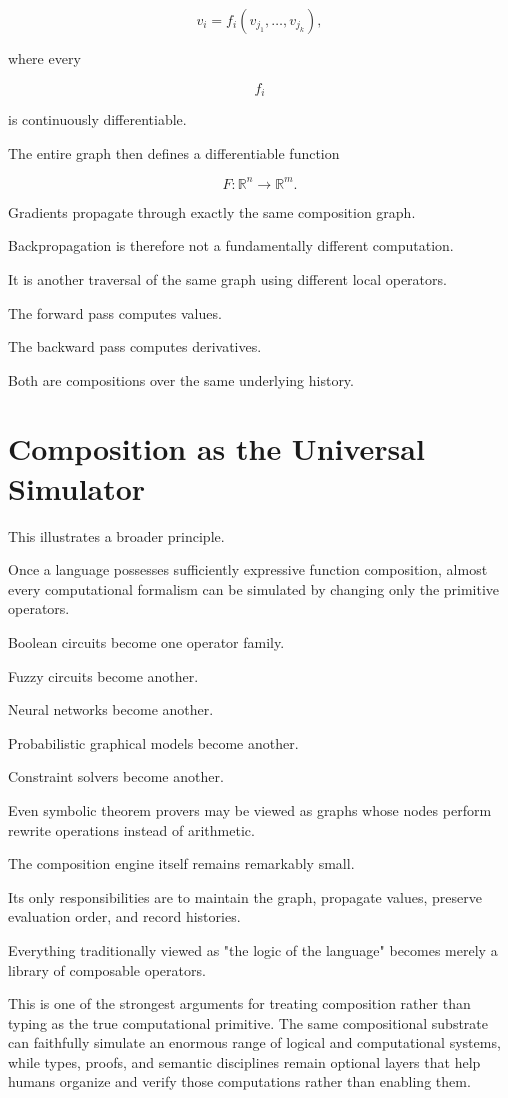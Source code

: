 \documentclass[12pt,oneside]{article}
\begin{document}
\[
v_i=f_i(v_{j_1},\ldots,v_{j_k}),
\]

where every

\[
f_i
\]

is continuously differentiable.

The entire graph then defines a differentiable function

\[
F:\mathbb{R}^n\rightarrow\mathbb{R}^m.
\]

Gradients propagate through exactly the same composition graph.

Backpropagation is therefore not a fundamentally different computation.

It is another traversal of the same graph using different local operators.

The forward pass computes values.

The backward pass computes derivatives.

Both are compositions over the same underlying history.

\section{Composition as the Universal Simulator}

This illustrates a broader principle.

Once a language possesses sufficiently expressive function composition, almost every computational formalism can be simulated by changing only the primitive operators.

Boolean circuits become one operator family.

Fuzzy circuits become another.

Neural networks become another.

Probabilistic graphical models become another.

Constraint solvers become another.

Even symbolic theorem provers may be viewed as graphs whose nodes perform rewrite operations instead of arithmetic.

The composition engine itself remains remarkably small.

Its only responsibilities are to maintain the graph, propagate values, preserve evaluation order, and record histories.

Everything traditionally viewed as "the logic of the language" becomes merely a library of composable operators.

This is one of the strongest arguments for treating composition rather than typing as the true computational primitive. The same compositional substrate can faithfully simulate an enormous range of logical and computational systems, while types, proofs, and semantic disciplines remain optional layers that help humans organize and verify those computations rather than enabling them.
\end{document}
